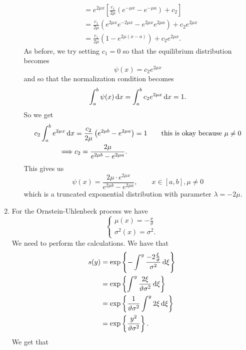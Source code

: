 \documentclass[12pt]{article}
\begin{document}
\begin{enumerate}
\begin{itemize}
\begin{align*}
			&=e^{2\mu x}\left[\frac{c_{1}}{2\mu}\left(e^{-\mu x}-e^{-\mu a}\right)+c_{2}\right]\\
			&=\frac{c_{1}}{2\mu}\left(e^{2\mu x}e^{-2\mu x}-e^{2\mu x}e^{2\mu a}\right)+c_{2}e^{2\mu x}\\
			&=\frac{c_{1}}{2\mu}\left(1-e^{2\mu(x-a)}\right) +c_{2}e^{2\mu x}.
		\end{align*}
		As before, we try setting $c_1=0$ so that the equilibrium distribution becomes
		\begin{equation*}
			\psi(x)=c_2e^{2\mu x}
		\end{equation*}
		and so that the normalization condition becomes
		\begin{align*}
			\int_{a}^{b}\psi(x)\mathop{}\!\mathrm{d} x=\int_{a}^{b}c_{2}e^{2\mu x}\mathop{}\!\mathrm{d} x=1.
		\end{align*}
		So we get
		\begin{align*}
			c_2\int_{a}^{b}e^{2\mu x}\mathop{}\!\mathrm{d} x&=\frac{c_2}{2\mu}\left(e^{2\mu b}-e^{2\mu a}\right)=1 \qquad\text{this is okay because }\mu\neq0\\
			\implies&c_2=\frac{2\mu}{e^{2\mu b}-e^{2\mu a}}.
		\end{align*}
		This gives us
		\begin{equation*}
			\psi(x)=\frac{2\mu\cdot e^{2\mu x}}{e^{2\mu b}-e^{2\mu a}},\qquad x\in[a,b],\mu \neq0
		\end{equation*}
		which is a truncated exponential distribution with parameter $\lambda=-2\mu$.
	\end{itemize}
	\item For the Ornstein-Uhlenbeck process we have
	\begin{equation*}
		\begin{cases}
			\mu(x)=-\frac{x}{\vartheta}\\
			\sigma^{2}(x)=\sigma^{2}.	\end{cases}
	\end{equation*}
	We need to perform the calculations. We have that
	\begin{align*}
		s(y)&=\exp\left\{-\int^{y}\frac{-2\frac{\xi}{\vartheta}}{\sigma^{2}}\mathop{}\!\mathrm{d}\xi\right\}\\
		&=\exp\left\{\int^{y}\frac{2\xi}{\vartheta\sigma^{2}}\mathop{}\!\mathrm{d}\xi\right\}\\
		&=\exp\left\{\frac{1}{\vartheta\sigma^{2}}\int^{y}2\xi\mathop{}\!\mathrm{d}\xi\right\}\\
		&=\exp\left\{\frac{y^{2}}{\vartheta\sigma^{2}}\right\}.
	\end{align*}
	We get that
	\begin{equation*}

\end{equation*}
\end{enumerate}
\end{document}
